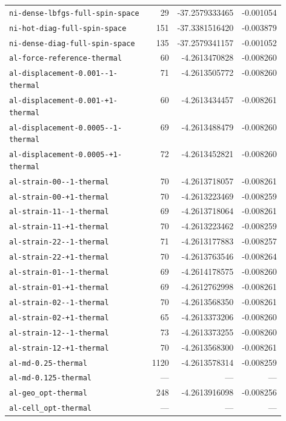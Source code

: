 \begin{longtable}{p{0.53\linewidth}rrr}
\nolinkurl{ni-dense-lbfgs-full-spin-space} & 29 & -37.2579333465 & -0.001054\\
\nolinkurl{ni-hot-diag-full-spin-space} & 151 & -37.3381516420 & -0.003879\\
\nolinkurl{ni-dense-diag-full-spin-space} & 135 & -37.2579341157 & -0.001052\\
\nolinkurl{al-force-reference-thermal} & 60 & -4.2613470828 & -0.008260\\
\nolinkurl{al-displacement-0.001--1-thermal} & 71 & -4.2613505772 & -0.008260\\
\nolinkurl{al-displacement-0.001-+1-thermal} & 60 & -4.2613434457 & -0.008261\\
\nolinkurl{al-displacement-0.0005--1-thermal} & 69 & -4.2613488479 & -0.008260\\
\nolinkurl{al-displacement-0.0005-+1-thermal} & 72 & -4.2613452821 & -0.008260\\
\nolinkurl{al-strain-00--1-thermal} & 70 & -4.2613718057 & -0.008261\\
\nolinkurl{al-strain-00-+1-thermal} & 70 & -4.2613223469 & -0.008259\\
\nolinkurl{al-strain-11--1-thermal} & 69 & -4.2613718064 & -0.008261\\
\nolinkurl{al-strain-11-+1-thermal} & 70 & -4.2613223462 & -0.008259\\
\nolinkurl{al-strain-22--1-thermal} & 71 & -4.2613177883 & -0.008257\\
\nolinkurl{al-strain-22-+1-thermal} & 70 & -4.2613763546 & -0.008264\\
\nolinkurl{al-strain-01--1-thermal} & 69 & -4.2614178575 & -0.008260\\
\nolinkurl{al-strain-01-+1-thermal} & 69 & -4.2612762998 & -0.008261\\
\nolinkurl{al-strain-02--1-thermal} & 70 & -4.2613568350 & -0.008261\\
\nolinkurl{al-strain-02-+1-thermal} & 65 & -4.2613373206 & -0.008260\\
\nolinkurl{al-strain-12--1-thermal} & 73 & -4.2613373255 & -0.008260\\
\nolinkurl{al-strain-12-+1-thermal} & 70 & -4.2613568300 & -0.008261\\
\nolinkurl{al-md-0.25-thermal} & 1120 & -4.2613578314 & -0.008259\\
\nolinkurl{al-md-0.125-thermal} & --- & --- & ---\\
\nolinkurl{al-geo_opt-thermal} & 248 & -4.2613916098 & -0.008256\\
\nolinkurl{al-cell_opt-thermal} & --- & --- & ---\\

\end{longtable}
